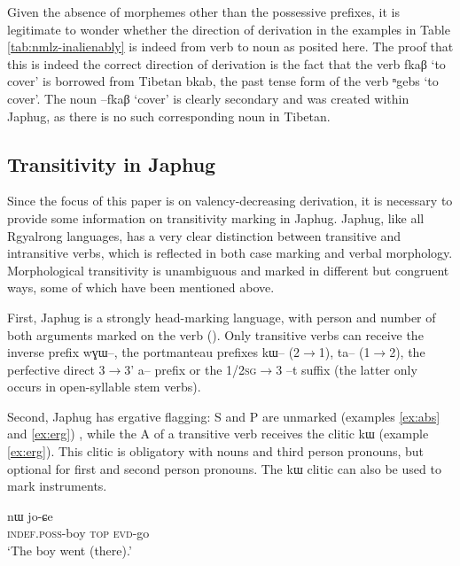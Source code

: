 \documentclass[oldfontcommands,oneside,a4paper,11pt]{article}
\newcommand{\ipa}[1]{{\phon \mbox{#1}}} %
\begin{document}
Given the absence of morphemes other than the possessive prefixes, it is legitimate to wonder whether the direction of derivation in the examples in Table \ref{tab:nmlz-inalienably} is indeed from verb to noun as posited here. The proof that this is indeed the correct direction of derivation is the fact that the verb \ipa{fkaβ} `to cover' is borrowed from Tibetan \ipa{bkab}, the past tense form of the verb \ipa{ⁿgebs} `to cover'. The noun \ipa{--fkaβ} `cover' is clearly secondary and was created within Japhug, as there is no such corresponding noun in Tibetan.

  
\subsection{Transitivity in Japhug} \label{subsec:trans}
Since the focus of this paper is on valency-decreasing derivation, it is necessary to provide some information on transitivity marking in Japhug. 
Japhug, like all Rgyalrong languages, has a very clear   distinction between transitive and intransitive verbs, which is reflected in both case marking and verbal morphology. Morphological transitivity is unambiguous and  marked in   different but congruent  ways, some of which have been mentioned above.

First,  Japhug  is a strongly head-marking language, with person and number of both arguments marked on the verb (\citealt{jacques10inverse}). Only transitive verbs can receive the inverse prefix \ipa{wɣɯ}--, the portmanteau prefixes \ipa{kɯ}-- (2$\rightarrow$1), \ipa{ta}-- (1$\rightarrow$2), the perfective direct 3$\rightarrow$3'  \ipa{a}-- prefix or  the 1/\textsc{2sg}$\rightarrow$3 --\ipa{t} suffix (the latter only occurs in open-syllable stem verbs).


Second, Japhug has ergative flagging:  S and P are unmarked (examples \ref{ex:abs} and \ref{ex:erg}) , while the A of a transitive verb receives the clitic \ipa{kɯ} (example \ref{ex:erg}). This clitic is obligatory with nouns and third person pronouns, but optional for first and second person pronouns. The \ipa{kɯ} clitic can also be used to mark instruments.

\begin{exe}
\ex \label{ex:abs}
\gll \ipa{tɤ-tɕɯ}  	\ipa{nɯ}  	 	\ipa{jo-ɕe}   \\
\textsc{indef.poss}-boy \textsc{top}   \textsc{evd}-go \\
\glt `The boy went (there).'
\end{exe}
\end{document}
